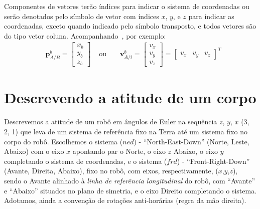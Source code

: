 Componentes de vetores terão índices para indicar o sistema de coordenadas ou serão denotados pelo símbolo de vetor com índices \(x\), \(y\), e \(z\) para indicar as coordenadas, exceto quando indicado pelo símbolo transposto, e todos vetores são do tipo vetor coluna. Acompanhando~\cite{Stevens2016}, por exemplo:
\begin{align*}
    &\mathbf{p}^{b}_{A/B} = \begin{bmatrix}x_{b} \\ y_{b} \\ z_{b}\end{bmatrix}&
    \text{ ou }&
    &\mathbf{v}^{b}_{A/i} = \begin{bmatrix} v_{x} \\ v_{y} \\ v_{z} \end{bmatrix} = \begin{bmatrix} v_{x} & v_{y} & v_{z} \end{bmatrix}^{T}
\end{align*}


\section{Descrevendo a atitude de um corpo}

Descrevemos a atitude de um robô em ângulos de Euler na sequência \(z\), \(y\), \(x\) (3, 2, 1) que leva de um sistema de referência fixo na Terra até um sistema fixo no corpo do robô. Escolhemos o sistema (\(ned\)) - ``North-East-Down'' (Norte, Leste, Abaixo) com o eixo \(x\) apontando par o Norte, o eixo \(z\) Abaixo, o eixo \(y\) completando o sistema de coordenadas, e o sistema (\(frd\)) - ``Front-Right-Down'' (Avante, Direita, Abaixo), fixo no robô, com eixos, respectivamente, (\(x\),\(y\),\(z\)), sendo o Avante alinhado à \emph{linha de referência longitudinal} do robô, com ``Avante'' e ``Abaixo'' situados no plano de simetria, e o eixo Direito completando o sistema. Adotamos, ainda a convenção de rotações anti-horárias (regra da mão direita).


